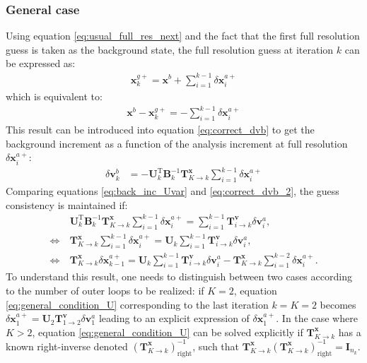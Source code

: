 \documentclass[npg, manuscript]{copernicus}
\begin{document}
\subsubsection{General case}
Using equation \eqref{eq:usual_full_res_next} and the fact that the first full resolution guess is taken as the background state, the full resolution guess at iteration $k$ can be expressed as:
\begin{align}
\label{eq:usual_full_res}
\mathbf{x}^{g+}_k = \mathbf{x}^{b} + \sum_{i=1}^{k-1} \delta \mathbf{x}^{a+}_i
\end{align}
which is equivalent to:
\begin{align}
\mathbf{x}^b - \mathbf{x}^{g+}_k = - \sum_{i=1}^{k-1} \delta \mathbf{x}^{a+}_i
\end{align}
This result can be introduced into equation \eqref{eq:correct_dvb} to get the background increment as a function of the analysis increment at full resolution $\delta \mathbf{x}^{a+}_i$:
\begin{align}
\label{eq:correct_dvb_2}
\delta \mathbf{v}^b_k & = -\mathbf{U}_k^\mathrm{T} \mathbf{B}^{-1}_k \mathbf{T}^\mathbf{x}_{K \rightarrow k} \sum_{i=1}^{k-1} \delta \mathbf{x}^{a+}_i
\end{align}
Comparing equations \eqref{eq:back_inc_Uvar} and \eqref{eq:correct_dvb_2}, the guess consistency is maintained if:
\begin{align}
\label{eq:general_condition_U}
& \mathbf{U}_k^\mathrm{T} \mathbf{B}^{-1}_k \mathbf{T}^\mathbf{x}_{K \rightarrow k} \sum_{i=1}^{k-1} \delta \mathbf{x}^{a+}_i = \sum_{i=1}^{k-1} \mathbf{T}^\mathbf{v}_{i \rightarrow k} \delta \mathbf{v}^a_i, \nonumber \\
\Leftrightarrow \ & \mathbf{T}^\mathbf{x}_{K \rightarrow k} \sum_{i=1}^{k-1} \delta \mathbf{x}^{a+}_i = \mathbf{U}_k \sum_{i=1}^{k-1} \mathbf{T}^\mathbf{v}_{i \rightarrow k} \delta \mathbf{v}^a_i, \nonumber \\
\Leftrightarrow \ & \boxed{\mathbf{T}^\mathbf{x}_{K \rightarrow k} \delta \mathbf{x}^{a+}_{k-1} = \mathbf{U}_k \sum_{i=1}^{k-1} \mathbf{T}^\mathbf{v}_{i \rightarrow k} \delta \mathbf{v}^a_i - \mathbf{T}^\mathbf{x}_{K \rightarrow k} \sum_{i=1}^{k-2} \delta \mathbf{x}^{a+}_i}.
\end{align}
To understand this result, one needs to distinguish between two cases according to the number of outer loops to be realized: if $K=2$, equation \eqref{eq:general_condition_U} corresponding to the last iteration $k=K=2$ becomes $\delta \mathbf{x}^{a+}_1 = \mathbf{U}_2 \mathbf{T}^\mathbf{v}_{1 \rightarrow 2} \delta \mathbf{v}^a_1$ leading to an explicit expression of $\delta \mathbf{x}^{a+}_1$. In the case where $K>2$, equation \eqref{eq:general_condition_U} can be solved explicitly if $\mathbf{T}^\mathbf{x}_{K \rightarrow k}$ has a known right-inverse denoted $\left(\mathbf{T}^\mathbf{x}_{K \rightarrow k}\right)^{-1}_\text{right}$, such that $\mathbf{T}^\mathbf{x}_{K \rightarrow k} \left(\mathbf{T}^\mathbf{x}_{K \rightarrow k}\right)^{-1}_\text{right} = \mathbf{I}_{n_k}$.
\end{document}
